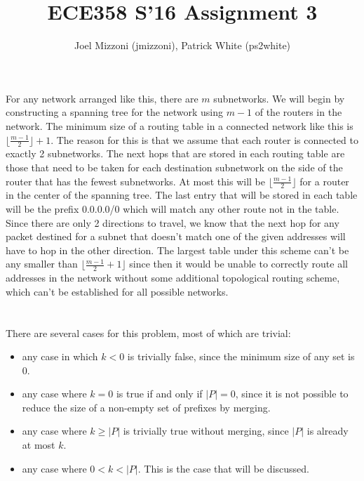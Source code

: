 \documentclass[10pt,a4paper]{article}
\author{Joel Mizzoni (jmizzoni), Patrick White (ps2white)}
\begin{document}
\title{ECE358 S'16 Assignment 3}
\newcommand{\floor}[1]{\lfloor#1\rfloor}
\maketitle
\section{}
For any network arranged like this, there are $m$ subnetworks. We will begin by constructing a spanning tree for the network using $m - 1$ of the routers in the network. The minimum size of a routing table in a connected network like this is $\floor{\frac{m - 1}{2}} + 1$. The reason for this is that we assume that each router is connected to exactly 2 subnetworks.  The next hops that are stored in each routing table are those that need to be taken for each destination subnetwork on the side of the router that has the fewest subnetworks. At most this will be $\floor{\frac{m - 1}{2}}$ for a router in the center of the spanning tree. The last entry that will be stored in each table will be the prefix 0.0.0.0/0 which will match any other route not in the table. Since there are only 2 directions to travel, we know that the next hop for any packet destined for a subnet that doesn't match one of the given addresses will have to hop in the other direction. The largest table under this scheme can't be any smaller than $\floor{\frac{m - 1}{2} + 1}$ since then it would be unable to correctly route all addresses in the network without some additional topological routing scheme, which can't be established for all possible networks.

\section{}
There are several cases for this problem, most of which are trivial:
\begin{itemize}
\item any case in which $k<0$ is trivially false, since the minimum size of any set is $0$.
\item any case where $k=0$ is true if and only if $|P|=0$, since it is not possible to reduce the size of a non-empty set of prefixes by merging.
\item any case where $k\geq |P|$ is trivially true without merging, since $|P|$ is already at most $k$.
\item any case where $0<k<|P|$. This is the case that will be discussed.
\end{itemize}
\end{document}

